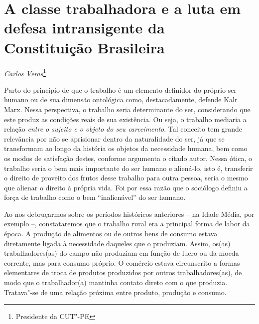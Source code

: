 \chapter{A classe trabalhadora e a luta em defesa intransigente da
Constituição Brasileira}

\begin{flushright}
\emph{Carlos Veras}\footnote{Presidente da CUT"-PE}
\end{flushright}

Parto do princípio de que o trabalho é um elemento definidor do próprio
ser humano ou de sua dimensão ontológica como, destacadamente, defende
Kalr Marx. Nessa perspectiva, o trabalho seria determinante do ser,
considerando que este produz as condições reais de sua existência. Ou
seja, o trabalho mediaria a relação \emph{entre o sujeito e o objeto do
seu carecimento}. Tal conceito tem grande relevância por não se
aprisionar dentro da naturalidade do ser, já que se transformam ao longo
da história os objetos da necessidade humana, bem como os modos de
satisfação destes, conforme argumenta o citado autor. Nessa ótica, o
trabalho seria o bem mais importante do ser humano e aliená-lo, isto é,
transferir o direito de proveito dos frutos desse trabalho para outra
pessoa, seria o mesmo que alienar o direito à própria vida. Foi por essa
razão que o sociólogo definiu a força de trabalho como o bem
``inalienável'' do ser humano.

Ao nos debruçarmos sobre os períodos históricos anteriores -- na Idade
Média, por exemplo --, constataremos que o trabalho rural era a
principal forma de labor da época. A produção de alimentos ou de outros
bens de consumo estava diretamente ligada à necessidade daqueles que o
produziam. Assim, os(as) trabalhadores(as) do campo não produziam em
função de lucro ou da moeda corrente, mas para consumo próprio. O
comércio estava circunscrito a formas elementares de troca de produtos
produzidos por outros trabalhadores(as), de modo que o trabalhador(a)
mantinha contato direto com o que produzia. Tratava"-se de uma relação
próxima entre produto, produção e consumo.

